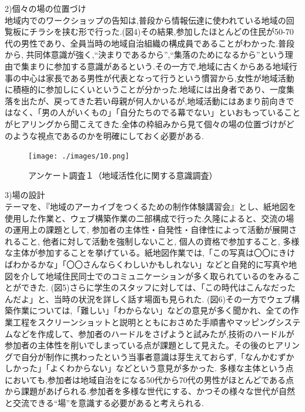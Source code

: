 \documentclass[a4paper]{jsarticle}
\begin{document}
\item 2)個々の場の位置づけ\\
地域内でのワークショップの告知は,普段から情報伝達に使われている地域の回覧板にチラシを挟む形で行った.(図4)その結果,参加したほとんどの住民が50-70代の男性であり、全員当時の地域自治組織の構成員であることがわかった.普段から, 共同体意識が強く,“決まりであるから”,“集落のためになるから”という理由で集まりに参加する意識があるという.その一方で,地域に古くからある地域行事の中心は家長である男性が代表となって行うという慣習から,女性が地域活動に積極的に参加しにくいということが分かった.地域には出身者であり、一度集落を出たが、戻ってきた若い母親が何人かいるが,地域活動にはあまり前向きではなく、「男の人がいくもの」「自分たちのでる幕でない」といおもっていることがヒアリングから聞こえてきた.全体の枠組みから見て個々の場の位置づけがどのような視点であるのかを明確にしておく必要がある.\\
\begin{figure}[H]
  \begin{center}
    \texttt{[image: ./images/10.png]}
    \caption{アンケート調査１（地域活性化に関する意識調査）}
    \label{fig:tmu_hino}
  \end{center}
\end{figure}

\item 3)場の設計\\
テーマを、『地域のアーカイブをつくるための制作体験講習会』とし、紙地図を使用した作業と、ウェブ構築作業の二部構成で行った.久隆によると、交流の場の運用上の課題として, 参加者の主体性・自発性・自律性によって活動が展開されること, 他者に対して活動を強制しないこと, 個人の資格で参加すること, 多様な主体が参加することを挙げている。\cite{10}紙地図作業では,「この写真は〇〇にきけばわかるかな」「〇〇さんならくわしいかもしれない」などと自発的に写真や地図を介して地域住民同士でのコミュニケーションが多く取られているのをみることができた. (図5)さらに学生のスタッフに対しては、「この時代はこんなだったんだよ」と、当時の状況を詳しく話す場面も見られた. (図6)その一方でウェブ構築作業については,「難しい」「わからない」などの意見が多く聞かれ、全ての作業工程をスクリーンショットと説明とともにおさめた手順書やマッピングシステムなどを作成して、参加者のハードルをさげようと試みたが,技術のハードルが参加者の主体性を削いでしまっている点が課題として見えた。その後のヒアリングで自分が制作に携わったという当事者意識は芽生えておらず,「なんかむずかしかった」「よくわからない」などという意見が多かった.
多様な主体という点においても,参加者は地域自治をになる50代から70代の男性がほとんどである点から課題があげられる.参加者を多様な世代にする、かつその様々な世代が自然と交流できる“場”を意識する必要があると考えられる.\\\\\\\par
\end{document}
